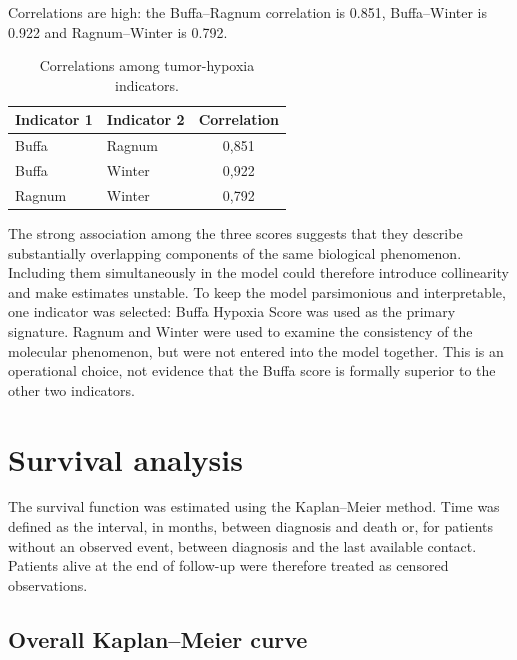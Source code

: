 \documentclass[12pt,a4paper]{article}
\begin{document}
Correlations are high: the Buffa--Ragnum correlation is 0.851, Buffa--Winter is 0.922 and Ragnum--Winter is 0.792.

\begin{table}[H]
    \centering
    \caption{Correlations among tumor-hypoxia indicators.}
    \label{tab:correlazioni_hypoxia}
    \renewcommand{\arraystretch}{1.2}
    \begin{tabular}{l l c}
        \toprule
        \textbf{Indicator 1} & \textbf{Indicator 2} & \textbf{Correlation} \\
        \midrule
        Buffa  & Ragnum & 0,851 \\
        Buffa  & Winter & 0,922 \\
        Ragnum & Winter & 0,792 \\
        \bottomrule
    \end{tabular}
\end{table}

The strong association among the three scores suggests that they describe substantially overlapping components of the same biological phenomenon. Including them simultaneously in the model could therefore introduce collinearity and make estimates unstable. To keep the model parsimonious and interpretable, one indicator was selected: Buffa Hypoxia Score was used as the primary signature. Ragnum and Winter were used to examine the consistency of the molecular phenomenon, but were not entered into the model together. This is an operational choice, not evidence that the Buffa score is formally superior to the other two indicators.


\section{Survival analysis}

The survival function was estimated using the Kaplan--Meier method. Time was defined as the interval, in months, between diagnosis and death or, for patients without an observed event, between diagnosis and the last available contact. Patients alive at the end of follow-up were therefore treated as censored observations.

\subsection{Overall Kaplan--Meier curve}
\end{document}
